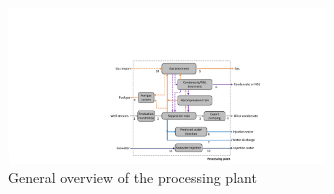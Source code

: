 \documentclass[times,3p]{elsarticle}
\begin{document}

\begin{figure}[htbp]
	\centering
	\includegraphics[width=0.75\textwidth]{general_process_overview.pdf}
	\caption{General overview of the processing plant}
	\label{fig:processing_plant}
\end{figure}
\end{document}
